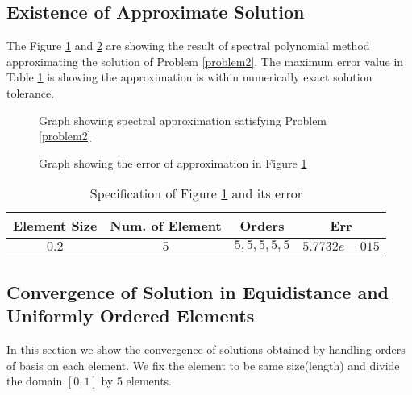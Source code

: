 \subsection{Existence of Approximate Solution}

The Figure \ref{crvconvf1} and \ref{crvconvf2} are showing the
result of spectral polynomial method approximating the solution of
Problem \ref{problem2}. The maximum error value in Table
 \ref{crvconv1t} is showing the approximation is within numerically
exact solution tolerance.

\begin{figure}[h]
\begin{center}
\caption{\label{crvconvf1}Graph showing spectral approximation
satisfying Problem \ref{problem2}}
\end{center}
\end{figure}

\begin{figure}[h]
\begin{center}
\caption{\label{crvconvf2}Graph showing the error of approximation
in Figure \ref{crvconvf1}}
\end{center}
\end{figure}

\begin{table}[h]
\centering \caption{\label{crvconv1t} Specification of
                              Figure \ref{crvconvf1} and its error}
\begin{tabular}{|c|c|c|c|} \hline
Element Size &Num. of Element &Orders    &Err   \\ \hline \hline
$0.2$        &$5$             &$5, 5, 5, 5, 5$ &$5.7732e-015$ \\
\hline
\end{tabular}
\end{table}


\clearpage

\subsection{Convergence of Solution in Equidistance and Uniformly Ordered Elements}

In this section we show the convergence of solutions obtained by
handling orders of basis on each element. We fix the element to be
same size(length) and divide the domain $[0, 1]$ by 5 elements.

